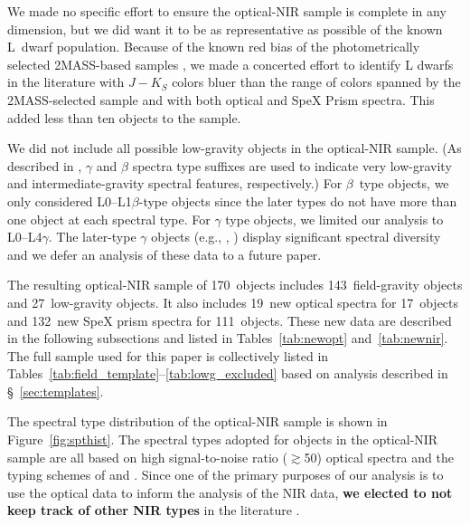 \documentclass[12pt]{aastex6}
\newcommand{\sample}{170}
\newcommand{\optField}{143}
\newcommand{\optLowG}{27}
\newcommand{\NewOptSpectra}{19} %
\newcommand{\NewOptObjects}{17} %
\newcommand{\NewPrismSpectra}{132} %
\newcommand{\NewPrismObjects}{111} %
\begin{document}
We made no specific effort to ensure the optical-NIR sample is complete in any dimension, but we did want it to be as representative as possible of the known L~dwarf population.
Because of the known red bias of the photometrically selected 2MASS-based samples \cite[Figure 3]{Schmidt10}, we made a concerted effort to identify L dwarfs in the literature with $J-K_S$ colors bluer than the range of colors spanned by the 2MASS-selected sample and with both optical and SpeX Prism spectra.
This added less than ten objects to the sample.

We did not include all possible low-gravity objects in the optical-NIR sample.
(As described in \cite{Cruz09_lowg}, $\gamma$ and $\beta$ spectra type suffixes are used to indicate very low-gravity and intermediate-gravity spectral features, respectively.)
For $\beta$~type objects, we only considered L0--L1$\beta$-type objects since the later types do not have more than one object at each spectral type.
For $\gamma$ type objects, we limited our analysis to L0--L4$\gamma$.
The later-type $\gamma$ objects (e.g., , \citealt{Cruz09_lowg}) display significant spectral diversity and we defer an analysis of these data to a future paper.

The resulting optical-NIR sample of \sample~objects includes \optField~field-gravity objects and \optLowG~low-gravity objects.
It also includes \NewOptSpectra~new optical spectra for \NewOptObjects~objects and \NewPrismSpectra~new SpeX prism spectra for \NewPrismObjects~objects.
These new data are described in the following subsections and listed in Tables~\ref{tab:newopt} and~\ref{tab:newnir}. The full sample used for this paper is collectively listed in Tables~\ref{tab:field_template}--\ref{tab:lowg_excluded} based on analysis described in \S~\ref{sec:templates}.

The spectral type distribution of the optical-NIR sample is shown in Figure~\ref{fig:spthist}.
The spectral types adopted for objects in the optical-NIR sample are all based on high signal-to-noise ratio ($\gtrsim$50) optical spectra and the typing schemes of \cite{K99} and \cite{Cruz09_lowg}.
Since one of the primary purposes of our analysis is to use the optical data to inform the analysis of the NIR data, \textbf{we elected to not keep track of other NIR types} in the literature \citep[e.g.,][]{Geballe02, Allers:2013hk, Marocco:2013kv, Gagne:2015dc}.
\end{document}
